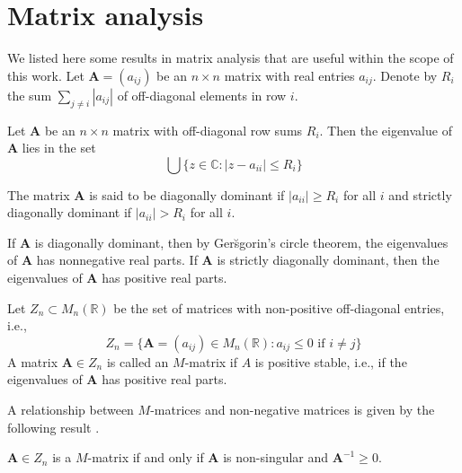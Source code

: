 \section{Matrix analysis}
\label{sec:matrix-analysis}
We listed here some results in matrix analysis that are useful within
the scope of this work.
%
Let $\mathbf{A} = (a_{ij})$ be an $n \times n$ matrix with real
entries $a_{ij}$. Denote by $R_i$ the sum $\sum_{j \not = i}{|a_{ij}|}$ of
off-diagonal elements in row $i$. 
%
\begin{theorem}
  \label{thm:1}
  Let $\mathbf{A}$ be an $n \times n$ matrix with off-diagonal row
  sums $R_i$. Then the eigenvalue of $\mathbf{A}$ lies in the set
  \begin{equation}
    \label{eq:23}
    \bigcup \{z \in \mathbb{C} \colon |z - a_{ii}| \leq R_i \}
  \end{equation}
\end{theorem}
\begin{definition}
  \label{def:4}
  The matrix $\mathbf{A}$ is said to be diagonally dominant if
  $|a_{ii}| \geq R_i$ for all $i$ and strictly diagonally dominant if
  $|a_{ii}| > R_i$ for all $i$.
\end{definition}
If $\mathbf{A}$ is diagonally dominant, then by Ger\u{s}gorin's
circle theorem, the eigenvalues of $\mathbf{A}$ has nonnegative real
parts. If $\mathbf{A}$ is strictly diagonally dominant, then the
eigenvalues of $\mathbf{A}$ has positive real parts. 
%
\begin{definition}
  \label{def:8}
  Let $Z_n \subset M_{n}(\mathbb{R})$ be the set of matrices with
  non-positive off-diagonal entries, i.e.,
  \begin{equation}
    \label{eq:24}
    Z_n = \{ \mathbf{A} = (a_{ij}) \in M_{n}(\mathbb{R}) \colon a_{ij}
    \leq 0 \,\, \text{if $i \not = j$} \}
  \end{equation}
 A matrix $\mathbf{A} \in Z_n$ is called an $M$-matrix if $A$ is
 positive stable, i.e., if the eigenvalues of $\mathbf{A}$ has
 positive real parts.
\end{definition}
A relationship between $M$-matrices and non-negative matrices is given
by the following result \citep[see][\S 2.5]{horn94:_topic_in_matrix_analy}.
\begin{theorem}
  \label{thm:2}
  $\mathbf{A} \in Z_n$ is a $M$-matrix if and only if $\mathbf{A}$ is
  non-singular and $\mathbf{A}^{-1} \geq 0$.  
\end{theorem}
